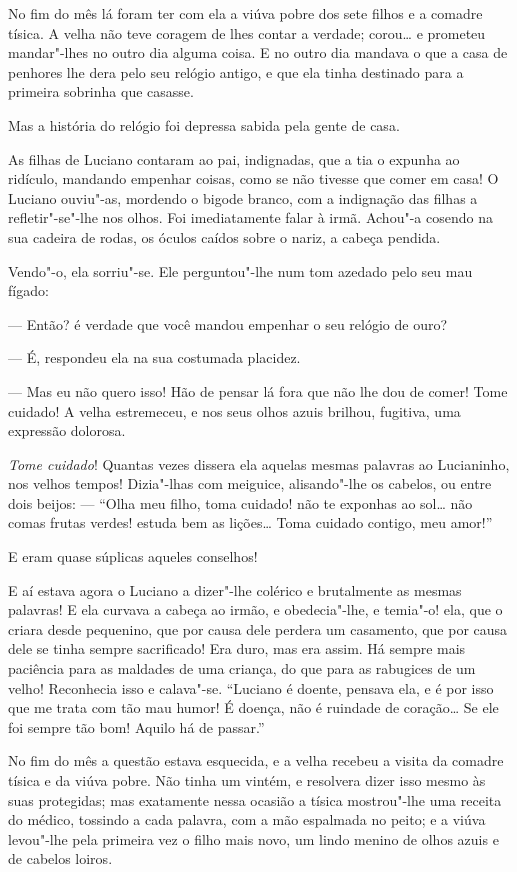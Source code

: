 No fim do mês lá foram ter com ela a viúva pobre dos sete filhos e a
comadre tísica. A velha não teve coragem de lhes contar a verdade;
corou\ldots{} e prometeu mandar"-lhes no outro dia alguma coisa. E no outro
dia mandava o que a casa de penhores lhe dera pelo seu relógio antigo, e
que ela tinha destinado para a primeira sobrinha que casasse.

Mas a história do relógio foi depressa sabida pela gente de casa.

As filhas de Luciano contaram ao pai, indignadas, que a tia o expunha ao
ridículo, mandando empenhar coisas, como se não tivesse que comer em
casa! O Luciano ouviu"-as, mordendo o bigode branco, com a indignação das
filhas a refletir"-se"-lhe nos olhos. Foi imediatamente falar à irmã.
Achou"-a cosendo na sua cadeira de rodas, os óculos caídos sobre o nariz,
a cabeça pendida.

Vendo"-o, ela sorriu"-se. Ele perguntou"-lhe num tom azedado pelo seu mau
fígado:

--- Então? é verdade que você mandou empenhar o seu relógio de ouro?

--- É, respondeu ela na sua costumada placidez.

--- Mas eu não quero isso! Hão de pensar lá fora que não lhe dou de
comer! Tome cuidado! A velha estremeceu, e nos seus olhos azuis brilhou,
fugitiva, uma expressão dolorosa.

\emph{Tome cuidado}! Quantas vezes dissera ela aquelas mesmas palavras
ao Lucianinho, nos velhos tempos! Dizia"-lhas com meiguice, alisando"-lhe
os cabelos, ou entre dois beijos: --- ``Olha meu filho, toma cuidado!
não te exponhas ao sol\ldots{} não comas frutas verdes! estuda bem as
lições\ldots{} Toma cuidado contigo, meu amor!''

E eram quase súplicas aqueles conselhos!

E aí estava agora o Luciano a dizer"-lhe colérico e brutalmente as mesmas
palavras! E ela curvava a cabeça ao irmão, e obedecia"-lhe, e temia"-o!
ela, que o criara desde pequenino, que por causa dele perdera um
casamento, que por causa dele se tinha sempre sacrificado! Era duro, mas
era assim. Há sempre mais paciência para as maldades de uma criança, do
que para as rabugices de um velho! Reconhecia isso e calava"-se.
``Luciano é doente, pensava ela, e é por isso que me trata com tão mau
humor! É doença, não é ruindade de coração\ldots{} Se ele foi sempre tão bom!
Aquilo há de passar.''

No fim do mês a questão estava esquecida, e a velha recebeu a visita da
comadre tísica e da viúva pobre. Não tinha um vintém, e resolvera dizer
isso mesmo às suas protegidas; mas exatamente nessa ocasião a tísica
mostrou"-lhe uma receita do médico, tossindo a cada palavra, com a mão
espalmada no peito; e a viúva levou"-lhe pela primeira vez o filho mais
novo, um lindo menino de olhos azuis e de cabelos loiros.

